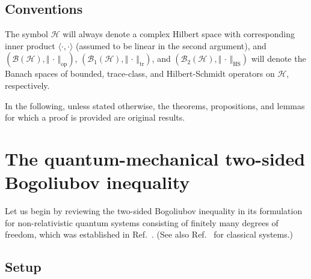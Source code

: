 \documentclass[a4paper, twoside, 11pt, reqno]{amsart}
\theoremstyle{definition}
\theoremstyle{plain}
\newcommand{\MH}{\mathcal{H}}
\newcommand{\BO}{\mathscr{B}}
\newcommand{\NO}{\BO_1}
\newcommand{\HS}{\BO_2}
\newcommand{\1}{\mathbf{1}}
\newcommand{\norm}[2][]{#1\Vert{#2}#1\Vert}
\newcommand{\braket}[2][]{#1\langle{#2}#1\rangle}
\newcommand{\ndot}{\norm{\,\cdot\,}}
\newcommand{\bdot}{\braket{\cdot, \cdot}}
\newcommand{\mop}{\mathrm{op}}
\begin{document}
\subsection{Conventions}

The symbol $\MH$ will always denote a complex Hilbert space with corresponding inner product $\bdot$ (assumed to be linear in the second argument), and $(\BO(\MH), \ndot_\mop)$, $(\NO(\MH), \ndot_\mathrm{tr})$, and $(\HS(\MH), \ndot_\mathrm{HS})$ will denote the Banach spaces of bounded, trace-class, and Hilbert-Schmidt operators on $\MH$, respectively.

In the following, unless stated otherwise, the theorems, propositions, and lemmas for which a proof is provided are original results.



\section{The quantum-mechanical two-sided Bogoliubov inequality}\label{sec:BogoliubovQM}

Let us begin by reviewing the two-sided Bogoliubov inequality in its formulation for non-relativistic quantum systems consisting of finitely many degrees of freedom, which was established in Ref.~\cite{Reible2022}. (See also Ref.~\cite{DelleSite2017} for classical systems.)


\subsection{Setup}\label{subsec:BogoliubovSetup}
\end{document}
